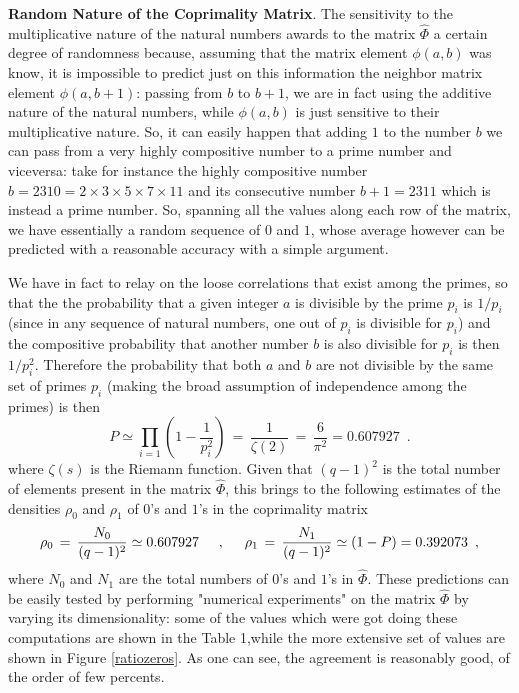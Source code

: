 \documentclass[aps,pra,superscriptaddress]{revtex4}
\newcommand\be            {\begin{equation}}
\newcommand\ee            {\end{equation}}
\renewcommand{\(}{\left(}
\renewcommand{\)}{\right)}
\renewcommand{\[}{\left[}
\renewcommand{\]}{\right]}
\begin{document}
\vspace{3mm}
\noindent
{\bf Random Nature of the Coprimality Matrix}. 
The sensitivity to the multiplicative nature of the natural numbers awards to the matrix $\widehat\Phi$ a certain degree of randomness because, assuming that the matrix element $\phi(a,b)$ was know, it is impossible to predict just on this information the neighbor matrix element $\phi(a,b+1)$: passing from $b$ to $b+1$, we are in fact using the additive nature of the natural numbers, while $\phi(a,b)$ is just sensitive to their multiplicative nature. So, it can easily happen that adding $1$ to the number $b$ we can pass from a very highly compositive number to a prime number and viceversa: take for instance the highly compositive number $b = 2310 = 2 \times 3 \times 5 \times 7 \times 11$ and its consecutive number $b+1 = 2311$ which is instead a prime number. So, spanning all the values along each row of the matrix, we have essentially a random sequence of $0$ and $1$, whose average however can be predicted with a reasonable accuracy with a simple argument. 

We have in fact to relay on the loose correlations that exist among the primes, so that the the probability that a given integer $a$ is divisible by the prime $p_i$ is $1/p_i$ (since in any sequence of natural numbers, one out of $p_i$ is divisible for $p_i$) and the compositive probability that another number $b$ is also divisible for $p_i$ is then $1/p_i^2$. Therefore the probability that both $a$ and $b$ are not divisible by the same set of primes $p_i$ (making the broad assumption of independence among the primes) is then 
\be 
P \simeq \prod_{i=1} \left(1 - \frac{1}{p_i^2}\right) \,=\,\frac{1}{\zeta(2)} \,=\,\frac{6}{\pi^2} = 0.607927 \,\,\,.
\ee
where $\zeta(s)$ is the Riemann function. Given that $(q-1)^2$ is the total number of elements present in the 
matrix $\widehat\Phi$, this brings to the following estimates of the densities $\rho_0$ and $\rho_1$ 
of $0$'s and $1$'s in the coprimality matrix 
\be
\rho_0 \,=\,\frac{N_0}{(q-1)^2} \simeq  0.607927 
\hspace{5mm}
, 
\hspace{5mm}
\rho_1 \,=\,\frac{N_1}{(q-1)^2} \simeq (1-P) = 0.392073 \,\,\,, 
\ee
where $N_{0}$ and $N_1$ are the total numbers of $0$'s and $1$'s in $\widehat\Phi$. These predictions can be easily tested by performing "numerical experiments" on the matrix $\widehat\Phi$ by varying its dimensionality: some of the values which were got doing these computations are shown in the Table 1,while the more extensive set of values are shown in Figure \ref{ratiozeros}. As one can see, the agreement is reasonably good, of the order of few percents.     
\end{document}
